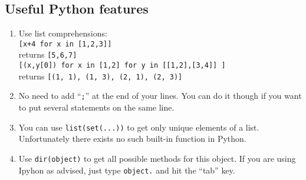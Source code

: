 \documentclass[a4paper,11pt]{article}
\begin{document}
\subsection{Useful Python features}
\begin{enumerate}
\item Use list comprehensions:\\
\texttt{[x+4 for x in [1,2,3]]} \\
returns \texttt{[5,6,7]} \\
\texttt{[(x,y[0]) for x in [1,2] for y in [[1,2],[3,4]] ]}\\
returns \texttt{[(1, 1), (1, 3), (2, 1), (2, 3)]}
\item No need to add ``\texttt{;}'' at the end of your lines. You can do it though if you want to put several statements on the same line.
\item You can use \texttt{list(set(...))} to get only unique elements of a list. Unfortunately there exists no such built-in function in Python.
\item Use \texttt{dir(object)} to get all possible methods for this object. If you are using Ipyhon as advised, just type \texttt{object.} and hit the ``tab'' key.
\end{enumerate}
\end{document}
